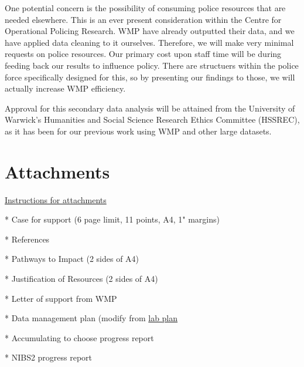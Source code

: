 \documentclass[11pt, a4paper]{article}
\begin{document}
One potential concern is the possibility of consuming police resources that are needed elsewhere. This is an ever present consideration within the Centre for Operational Policing Research. WMP have already outputted their data, and we have applied data cleaning to it ourselves. Therefore, we will make very minimal requests on police resources. Our primary cost upon staff time will be during feeding back our results to influence policy. There are structuers within the police force specifically designed for this, so by presenting our findings to those, we will actually increase WMP efficiency.

Approval for this secondary data analysis will be attained from the University of Warwick's Humanities and Social Science Research Ethics Committee (HSSREC), as it has been for our previous work using WMP and other large datasets.




\section{Attachments}

\href{https://je-s.rcuk.ac.uk/Handbook/Index.htm#pages/GuidanceonCompletingaStandardG/CaseforSupportandAttachments/ESRCSpecificRequirements.htm}{Instructions for attachments}

* Case for support (6 page limit, 11 points, A4, 1" margins) 

* References

* Pathways to Impact (2 sides of A4) 

* Justification of Resources (2 sides of A4)

* Letter of support from WMP

* Data management plan (modify from \href{https://github.com/neil-stewart/data_management_plan}{lab plan}


* Accumulating to choose progress report

* NIBS2 progress report



\newpage



\end{document}
